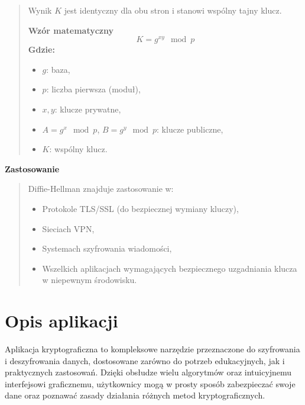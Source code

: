 \documentclass[12pt,a4paper]{article}
\begin{document}
\begin{quotation}
Wynik \( K \) jest identyczny dla obu stron i stanowi wspólny tajny klucz. \newline

\noindent\textbf{Wzór matematyczny}
\[
K = g^{xy} \mod p
\]
\newpage
\textbf{Gdzie:}
\begin{itemize}
    \item \( g \): baza,
    \item \( p \): liczba pierwsza (moduł),
    \item \( x, y \): klucze prywatne,
    \item \( A = g^x \mod p \), \( B = g^y \mod p \): klucze publiczne,
    \item \( K \): wspólny klucz.
\end{itemize}
\end{quotation}

\noindent\textbf{Zastosowanie}
\begin{quotation}\noindent  Diffie-Hellman znajduje zastosowanie w:
\begin{itemize}
\item Protokole TLS/SSL (do bezpiecznej wymiany kluczy),
\item Sieciach VPN,
\item Systemach szyfrowania wiadomości,
\item Wszelkich aplikacjach wymagających bezpiecznego uzgadniania klucza w niepewnym środowisku.
\end{itemize}
\end{quotation}



\newpage
\section{Opis aplikacji}
\noindent Aplikacja kryptograficzna to kompleksowe narzędzie przeznaczone do szyfrowania i deszyfrowania danych, dostosowane zarówno do potrzeb edukacyjnych, jak i praktycznych zastosowań. Dzięki obsłudze wielu algorytmów oraz intuicyjnemu interfejsowi graficznemu, użytkownicy mogą w prosty sposób zabezpieczać swoje dane oraz poznawać zasady działania różnych metod kryptograficznych.\newline
\end{document}
